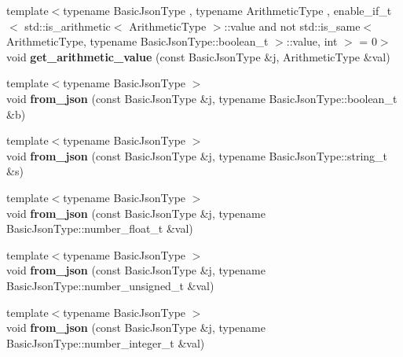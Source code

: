 \begin{DoxyCompactItemize}
\item 
\mbox{\label{namespacenlohmann_1_1detail_a85955b9c6dd31846e4b8e891f78614b6}} 
{\footnotesize template$<$typename Basic\+Json\+Type , typename Arithmetic\+Type , enable\+\_\+if\+\_\+t$<$ std\+::is\+\_\+arithmetic$<$ Arithmetic\+Type $>$\+::value and not std\+::is\+\_\+same$<$ Arithmetic\+Type, typename Basic\+Json\+Type\+::boolean\+\_\+t $>$\+::value, int $>$  = 0$>$ }\\void {\bfseries get\+\_\+arithmetic\+\_\+value} (const Basic\+Json\+Type \&j, Arithmetic\+Type \&val)
\item 
\mbox{\label{namespacenlohmann_1_1detail_a58117f225f43d03e3a0a4a6f3d77c9d9}} 
{\footnotesize template$<$typename Basic\+Json\+Type $>$ }\\void {\bfseries from\+\_\+json} (const Basic\+Json\+Type \&j, typename Basic\+Json\+Type\+::boolean\+\_\+t \&b)
\item 
\mbox{\label{namespacenlohmann_1_1detail_ad74d89f77ada7a57eff38b43d4bf2335}} 
{\footnotesize template$<$typename Basic\+Json\+Type $>$ }\\void {\bfseries from\+\_\+json} (const Basic\+Json\+Type \&j, typename Basic\+Json\+Type\+::string\+\_\+t \&s)
\item 
\mbox{\label{namespacenlohmann_1_1detail_a7cb5dd7d46a60e65f9a8e0873b3f7dd8}} 
{\footnotesize template$<$typename Basic\+Json\+Type $>$ }\\void {\bfseries from\+\_\+json} (const Basic\+Json\+Type \&j, typename Basic\+Json\+Type\+::number\+\_\+float\+\_\+t \&val)
\item 
\mbox{\label{namespacenlohmann_1_1detail_ace4d5680ba413d9fd897ccb5d9c61a1c}} 
{\footnotesize template$<$typename Basic\+Json\+Type $>$ }\\void {\bfseries from\+\_\+json} (const Basic\+Json\+Type \&j, typename Basic\+Json\+Type\+::number\+\_\+unsigned\+\_\+t \&val)
\item 
\mbox{\label{namespacenlohmann_1_1detail_a047d881e611fcac709dc318f730a1732}} 
{\footnotesize template$<$typename Basic\+Json\+Type $>$ }\\void {\bfseries from\+\_\+json} (const Basic\+Json\+Type \&j, typename Basic\+Json\+Type\+::number\+\_\+integer\+\_\+t \&val)

\end{DoxyCompactItemize}
